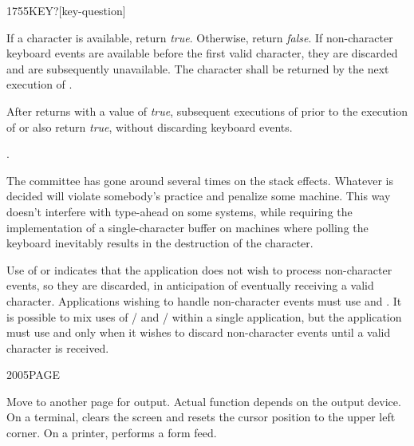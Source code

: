 \vspace*{-3ex}
\begin{worddef}[KEYq]{1755}{KEY?}[key-question]
\item {}

	If a character is available, return \emph{true}. Otherwise,
	return \emph{false}. If non-character keyboard events are
	available before the first valid character, they are discarded
	and are subsequently unavailable. The character shall be
	returned by the next execution of .

	After  returns with a value of \emph{true},
	subsequent executions of  prior to the execution
	of  or  also return \emph{true},
	without discarding keyboard events.

\see {}.

	\begin{rationale} %
		The committee has gone around several times on the
		stack effects. Whatever is decided will violate somebody's
		practice and penalize some machine. This way doesn't interfere
		with type-ahead on some systems, while requiring the
		implementation of a single-character buffer on machines where
		polling the keyboard inevitably results in the destruction of
		the character.

		Use of  or  indicates that the
		application does not wish to process non-character events,
		so they are discarded, in anticipation of eventually receiving
		a valid character. Applications wishing to handle non-character
		events must use  and . It is possible
		to mix uses of / and
		/ within a single application, but
		the application must use  and  only
		when it wishes to discard non-character events until a valid
		character is received.
		\newpage
	\end{rationale}
\end{worddef}

\vspace*{-3ex}
\enlargethispage{4ex}
\begin{worddef}{2005}{PAGE}
\item \stack{}{}

	Move to another page for output. Actual function depends on the
	output device. On a terminal,  clears the screen and
	resets the cursor position to the upper left corner. On a
	printer,  performs a form feed.
\end{worddef}


